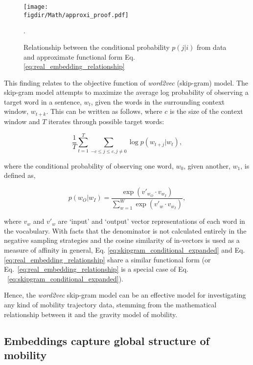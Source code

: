 \documentclass[12pt]{article} %
\def\figdir{../Figs}
\begin{document}
%
%
\begin{figure}
    \centering
    \texttt{[image: \\figdir/Math/approxi\_proof.pdf]}
    \caption{Relationship between the conditional probability $p(j|i)$ from data and approximate functional form Eq. \ref{eq:real_embedding_relationship}}.
    \label{fig:real_embedding_relationship}
\end{figure}

This finding relates to the objective function of \textit{word2vec} (skip-gram) model. The skip-gram model attempts to maximize the average log probability of observing a target word in a sentence, $w_{t}$, given the words in the surrounding context window, $w_{t + k}$. This can be written as follows, where $c$ is the size of the context window and $T$ iterates through possible target words:

\begin{equation}
    \label{eq:skipgram_log_prob_condensed}
    \frac{1}{T}\sum_{t=1}^{T} \sum_{-c \le j \le c, j \neq 0} \log p(w_{t+j}|w_t),
\end{equation}

where the conditional probability of observing one word, $w_{0}$, given another, $w_{1}$, is defined as,

\begin{equation}
    \label{eq:skipgram_conditional_expanded}
    p(w_O|w_I) = \frac{\exp(v'_{w_O} \cdot v_{w_I})}{\sum_{w=1}^{W} \exp(v'_w \cdot v_{w_I})},
\end{equation}

where $v_w$ and $v'_w$ are `input' and `output' vector representations of each word in the vocabulary. With facts that the denominator is not calculated entirely in the negative sampling strategies and the cosine similarity of in-vectors is used as a measure of affinity in general, Eq. \ref{eq:skipgram_conditional_expanded} and Eq. \ref{eq:real_embedding_relationship} share a similar functional form (or Eq.~\ref{eq:real_embedding_relationship} is a special case of Eq. ~\ref{eq:skipgram_conditional_expanded}).

Hence, the \textit{word2vec} skip-gram model can be an effective model for investigating any kind of mobility trajectory data, stemming from the mathematical relationship between it and the gravity model of mobility.


%
%
\subsection*{Embeddings capture global structure of mobility}
\end{document}
